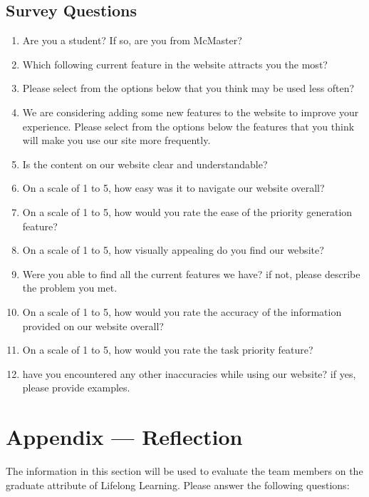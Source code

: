 \documentclass[12pt, titlepage]{article}
\begin{document}
\subsection{Survey Questions}

\begin{enumerate}
  \item Are you a student? If so, are you from McMaster?
  \item Which following current feature in the website attracts you the most?
  \item Please select from the options below that you think may be used less often?
  \item We are considering adding some new features to the website to improve your experience. Please select from the options below the features that you think will make you use our site more frequently.
  \item Is the content on our website clear and understandable?
  \item On a scale of 1 to 5, how easy was it to navigate our website overall?
  \item On a scale of 1 to 5, how would you rate the ease of the priority generation feature?
  \item On a scale of 1 to 5, how visually appealing do you find our website?
  \item Were you able to find all the current features we have? if not, please describe the problem you met.
  \item On a scale of 1 to 5, how would you rate the accuracy of the information provided on our website overall?
  \item On a scale of 1 to 5, how would you rate the task priority feature?
  \item have you encountered any other inaccuracies while using our website? if yes, please provide examples.
\end{enumerate}

\newpage{}
\section*{Appendix --- Reflection}


The information in this section will be used to evaluate the team members on the
graduate attribute of Lifelong Learning.  Please answer the following questions:
\end{document}
